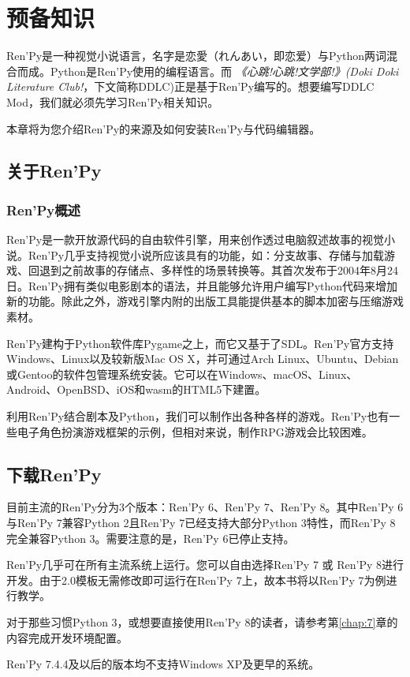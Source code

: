 \documentclass[../../Main.tex]{subfiles}
\begin{document}
\chapter{预备知识}
Ren'Py是一种视觉小说语言，名字是恋愛（れんあい，即恋爱）与Python两词混合而成。Python是Ren'Py使用的编程语言。而 \textit{《心跳!心跳!文学部!》(Doki Doki Literature Club!}，下文简称DDLC)正是基于Ren'Py编写的。想要编写DDLC Mod，我们就必须先学习Ren'Py相关知识。

本章将为您介绍Ren'Py的来源及如何安装Ren'Py与代码编辑器。

\section{关于Ren'Py}
\subsection{Ren'Py概述}
Ren'Py是一款开放源代码的自由软件引擎，用来创作透过电脑叙述故事的视觉小说。Ren'Py几乎支持视觉小说所应该具有的功能，如：分支故事、存储与加载游戏、回退到之前故事的存储点、多样性的场景转换等。其首次发布于2004年8月24日。Ren'Py拥有类似电影剧本的语法，并且能够允许用户编写Python代码来增加新的功能。除此之外，游戏引擎内附的出版工具能提供基本的脚本加密与压缩游戏素材。

Ren'Py建构于Python软件库Pygame之上，而它又基于了SDL。Ren'Py官方支持Windows、Linux以及较新版Mac OS X，并可通过Arch Linux、Ubuntu、Debian或Gentoo的软件包管理系统安装。它可以在Windows、macOS、Linux、Android、OpenBSD、iOS和wasm的HTML5下建置。

利用Ren'Py结合剧本及Python，我们可以制作出各种各样的游戏。Ren'Py也有一些电子角色扮演游戏框架的示例，但相对来说，制作RPG游戏会比较困难。

\section{下载Ren'Py}
\label{1.2}
目前主流的Ren'Py分为3个版本：Ren'Py 6、Ren'Py 7、Ren'Py 8。其中Ren'Py 6与Ren'Py 7兼容Python 2且Ren'Py 7已经支持大部分Python 3特性，而Ren'Py 8完全兼容Python 3。需要注意的是，Ren'Py 6已停止支持。

Ren'Py几乎可在所有主流系统上运行。您可以自由选择Ren'Py 7 或 Ren'Py 8进行开发。由于2.0模板无需修改即可运行在Ren'Py 7上，故本书将以Ren'Py 7为例进行教学。
\begin{Comment}
    对于那些习惯Python 3，或想要直接使用Ren'Py 8的读者，请参考第\ref{chap:7}章的内容完成开发环境配置。

    Ren'Py 7.4.4及以后的版本均不支持Windows XP及更早的系统。
\end{Comment}
\end{document}
